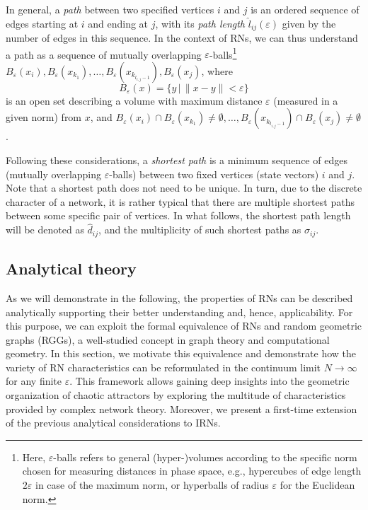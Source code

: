 In general, a \emph{path} between two specified vertices $i$ and $j$ is an ordered sequence of edges starting at $i$ and ending at $j$, with its \emph{path length} $\hat{l}_{ij}(\varepsilon)$ given by the number of edges in this sequence. In the context of RNs, we can thus understand a path as a sequence of mutually overlapping $\varepsilon$-balls\footnote{Here, $\varepsilon$-balls refers to general (hyper-)volumes according to the specific norm chosen for measuring distances in phase space, e.g., hypercubes of edge length $2\varepsilon$ in case of the maximum norm, or hyperballs of radius $\varepsilon$ for the Euclidean norm.} $B_{\varepsilon}(x_i),B_{\varepsilon}(x_{k_1}),\dots,B_{\varepsilon}(x_{k_{l_{i,j}-1}}),B_{\varepsilon}(x_j)$, where $$B_{\varepsilon}(x)=\{y\,|\,\|x-y\|<\varepsilon\}$$ is an open set describing a volume with maximum distance $\varepsilon$ (measured in a given norm) from $x$, and $B_{\varepsilon}(x_i)\cap B_{\varepsilon}(x_{k_1})\neq\emptyset,\dots,B_{\varepsilon}(x_{k_{l_{i,j}-1}})\cap B_{\varepsilon}(x_j)\neq\emptyset$.

Following these considerations, a \emph{shortest path} is a minimum sequence of edges (mutually overlapping $\varepsilon$-balls) between two fixed vertices (state vectors) $i$ and $j$. Note that a shortest path does not need to be unique. In turn, due to the discrete character of a network, it is rather typical that there are multiple shortest paths between some specific pair of vertices. In what follows, the shortest path length will be denoted as $\hat{d}_{ij}$, and the multiplicity of such shortest paths as $\hat{\sigma}_{ij}$.


	\subsection{Analytical theory}

As we will demonstrate in the following, the properties of RNs can be described analytically supporting their better understanding and, hence, applicability. For this purpose, we can exploit the formal equivalence of RNs and random geometric graphs (RGGs), a well-studied concept in graph theory and computational geometry. In this section, we motivate this equivalence and demonstrate how the variety of RN characteristics can be reformulated in the continuum limit $N\to\infty$ for any finite $\varepsilon$. This framework allows gaining deep insights into the geometric organization of chaotic attractors by exploring the multitude of characteristics provided by complex network theory. Moreover, we present a first-time extension~\cite{Donges2012PhD} of the previous analytical considerations \cite{Donges2012PRE} to IRNs.


